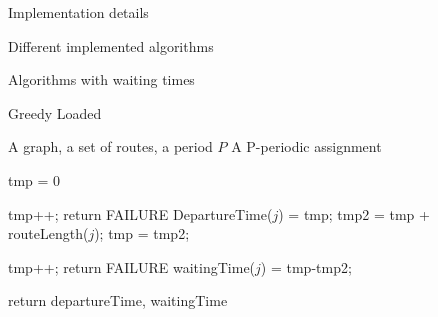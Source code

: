 \documentclass[10pt]{article}
\begin{document}
\begin{section}{Implementation details}
\begin{subsection}{Different implemented algorithms}
\begin{subsection}{Algorithms with waiting times}
\begin{subsubsection}{Greedy Loaded}
   	\begin{algorithm}[H]
 	\caption{Greedy Loaded}
 	\begin{algorithmic}
 	\REQUIRE A graph, a set of routes, a period $P$
	\ENSURE A P-periodic assignment

	
	\STATE tmp = $0$
	
 	
 	\STATE tmp++;
	\STATE return FAILURE
	\ENDIF
 	\ENDWHILE
	\STATE DepartureTime($j$) = tmp;
	\STATE tmp2 = tmp + routeLength($j$);
	\STATE tmp = tmp2;
	
 	
 	\STATE tmp++;
	\STATE return FAILURE
	\ENDIF
 	\ENDWHILE
	\STATE waitingTime($j$) = tmp-tmp2;
	\ENDIF
 	\ENDFOR

 	\ENDFOR
	\STATE return departureTime, waitingTime

 	\end{algorithmic}
 	\end{algorithm}

    \end{subsubsection}
  \end{subsection}
\end{subsection}
\end{section}


\end{document}
